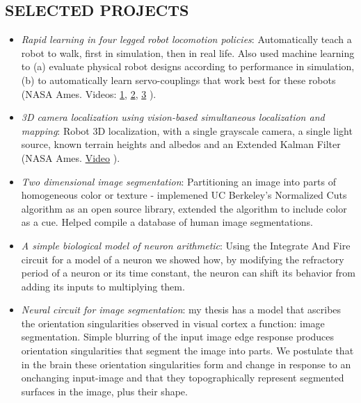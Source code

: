 \documentclass[conference,lettersize,twocolumn,twosize]{./IEEEtran}
\begin{document}
\subsection*{SELECTED PROJECTS}
\begin{center}
  \begin{itemize}
  \item{\emph{Rapid learning in four legged robot locomotion
      policies}: Automatically teach a robot to walk, first in
    simulation, then in real life. Also used machine learning to (a)
    evaluate physical robot designs according to performance in
    simulation, (b) to automatically learn servo-couplings that work
    best for these robots (NASA Ames. Videos:
    \href{https://www.youtube.com/watch?v=nOca5QXBuTQ}{1},
    \href{https://www.youtube.com/watch?v=\_Dw67QpAlhU}{2}, 
    \href{https://www.youtube.com/watch?v=rp31BvijiqU}{3}
    ).}
  \item{\emph{3D camera localization using vision-based simultaneous
    localization and mapping}: Robot 3D localization, with a single
    grayscale camera, a single light source, known terrain heights and
    albedos and an Extended Kalman Filter (NASA Ames.
    \href{https://www.youtube.com/watch?v=zmq\_9Zw\_Awo)}{Video}
    ).}
  \item{\emph{Two dimensional image segmentation}: Partitioning an
    image into parts of homogeneous color or texture - implemened UC
    Berkeley's Normalized Cuts algorithm as an open source library,
    extended the algorithm to include color as a cue. Helped compile a
    database of human image segmentations.}
  \item{\emph{A simple biological model of neuron arithmetic}: Using
    the Integrate And Fire circuit for a model of a neuron we showed
    how, by modifying the refractory period of a neuron or its time
    constant, the neuron can shift its behavior from adding its inputs
    to multiplying them.}
  \item{\emph{Neural circuit for image segmentation}:
    my thesis has a model that ascribes the orientation singularities
    observed in visual cortex a function: image segmentation. Simple
    blurring of the input image edge response produces orientation
    singularities that segment the image into parts. We postulate that
    in the brain these orientation singularities form and change in
    response to an onchanging input-image and that they
    topographically represent segmented surfaces in the image, plus
    their shape.}
  \end{itemize}
\end{center}
\end{document}
